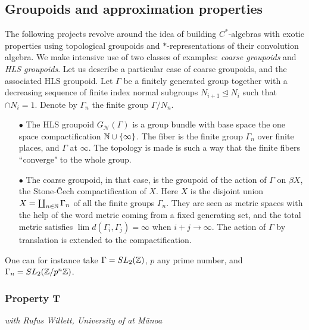 \subsection{Groupoids and approximation properties}

The following projects revolve around the idea of building $C^*$-algebras with exotic properties using topological groupoids and $*$-representations of their convolution algebra. We make intensive use of two classes of examples: \textit{coarse groupoids} and \textit{HLS groupoids}. Let us describe a particular case of coarse groupoids, and the associated HLS groupoid. Let $\Gamma$ be a finitely generated group together with a decreasing sequence of finite index normal subgroups $N_{i+1}\unlhd N_i$ such that $\cap N_i = 1$. Denote by $\Gamma_n$ the finite group $\Gamma/ N_n$.
\begin{itemize}
\item[$\bullet$] The HLS groupoid $G_{\mathcal N}(\Gamma)$ is a group bundle with base space the one space compactification $\mathbb{N} \cup \{\infty\}$. The fiber is the finite group $\Gamma_n$ over finite places, and $\Gamma$ at $\infty$. The topology is made is such a way that the finite fibers ``converge" to the whole group.  
\item[$\bullet$] The coarse groupoid, in that case, is the groupoid of the action of $\Gamma$ on $\beta X$, the Stone-\v{C}ech compactification of $X$. Here $X$ is the disjoint union $X= \coprod_{n\in \mathbb{N}} \Gamma_n$ of all the finite groups $\Gamma_n$. They are seen as metric spaces with the help of the word metric coming from a fixed generating set, and the total metric satisfies $\lim d(\Gamma_i, \Gamma_j)= \infty$ when $i+j \rightarrow \infty$. The action of $\Gamma$ by translation is extended to the compactification.  
\end{itemize}

One can for instance take $\Gamma = SL_2(\mathbb{Z}) $, $p$ any prime number, and $\Gamma_n = SL_2(\mathbb{Z} / p^n \mathbb{Z}) $. 
\subsubsection*{Property T}

\textit{with Rufus Willett, University of \Hawaii at M\={a}noa}\\

